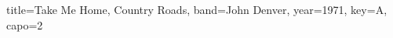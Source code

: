 \documentclass{skrul-leadsheet}
\begin{document}
\begin{song}[transpose-capo=true]{title={Take Me Home, Country Roads}, band={John Denver}, year={1971}, key={A}, capo={2}}



\end{song}
\end{document}
